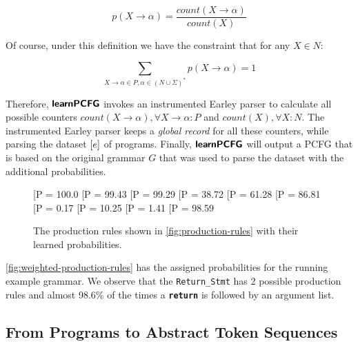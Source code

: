 \begin{equation*}
    p(X \rightarrow \alpha) = \frac{count(X \rightarrow \alpha)}{count(X)}
\end{equation*}

Of course, under this definition we have the constraint that for any $X \in N$:

\begin{equation*}
    \sum_{X \rightarrow \alpha \in P, \alpha \in (N \cup \Sigma)^{\ast}}{p(X \rightarrow \alpha)} = 1
\end{equation*}

Therefore, $\bm{\mathsf{learnPCFG}}$ invokes an instrumented Earley parser to calculate
all possible counters $count(X \rightarrow \alpha), \forall X \rightarrow
\alpha: P$ and $count(X), \forall X: N$. The instrumented Earley parser keeps a
\emph{global record} for all these counters, while parsing the dataset
$[e]$ of programs. Finally, $\bm{\mathsf{learnPCFG}}$ will output a PCFG that is
based on the original grammar $G$ that was used to parse the dataset with the
additional probabilities.

\begin{figure}[t]
    \begin{ecode}
    [P = 100.0%
    [P = 99.43%
    [P = 99.29%
    [P = 38.72%
    [P = 61.28%
    [P = 86.81%
    [P =  0.17%
    [P = 10.25%
    [P =  1.41%
    [P = 98.59%
    \end{ecode}
    \caption{The production rules shown in \autoref{fig:production-rules} with
    their learned probabilities.}
    \label{fig:weighted-production-rules}
\end{figure}

\autoref{fig:weighted-production-rules} has the assigned probabilities for the
running example grammar. We observe that the \texttt{Return\_Stmt} has 2
possible production rules and almost 98.6\% of the times a
\texttt{\textbf{return}} is followed by an argument list.


\subsection{From Programs to Abstract Token Sequences}

